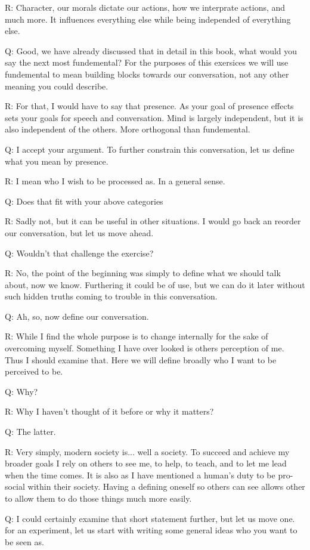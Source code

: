 R: Character, our morals dictate our actions, how we interprate actions, and much more. It influences everything else while being independed of everything else.

Q: Good, we have already discussed that in detail in this book, what would you say the next most fundemental? For the purposes of this exersices we will use fundemental to mean building blocks towards our conversation, not any other meaning you could describe.

R: For that, I would have to say that presence. As your goal of presence effects sets your goals for speech and conversation. Mind is largely independent, but it is also independent of the others. More orthogonal than fundemental.

Q: I accept your argument. To further constrain this conversation, let us define what you mean by presence.

R: I mean who I wish to be processed as. In a general sense.

Q: Does that fit with your above categories

R: Sadly not, but it can be useful in other situations. I would go back an reorder our conversation, but let us move ahead.

Q: Wouldn't that challenge the exercise?

R: No, the point of the beginning was simply to define what we should talk about, now we know. Furthering it could be of use, but we can do it later without such hidden truths coming to trouble in this conversation.

Q: Ah, so, now define our conversation.

R: While I find the whole purpose is to change internally for the sake of overcoming myself. Something I have over looked is others perception of me. Thus I should examine that. Here we will define broadly who I want to be perceived to be.

Q: Why?

R: Why I haven't thought of it before or why it matters?

Q: The latter.

R: Very simply, modern society is... well a society. To succeed and achieve my broader goals I rely on others to see me, to help, to teach, and to let me lead when the time comes. It is also as I have mentioned a human's duty to be pro-social within their society. Having a defining oneself so others can see allows other to allow them to do those things much more easily.

Q: I could certainly examine that short statement further, but let us move one. for an experiment, let us start with writing some general ideas who you want to be seen as.

